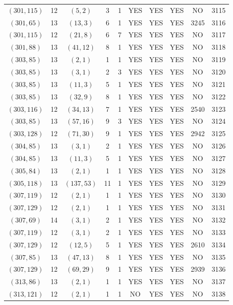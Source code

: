 \begin{longtable}{|c|c|c|c|c|c|c|c|c|c|}
$(301, 115)$ & 12 & $(5, 2)$ & 3 & 1 & YES & YES & YES & NO & 3115\\
$(301, 65)$ & 13 & $(13, 3)$ & 6 & 1 & YES & YES & YES & 3245 & 3116\\
$(301, 115)$ & 12 & $(21, 8)$ & 6 & 7 & YES & YES & YES & NO & 3117\\
$(301, 88)$ & 13 & $(41, 12)$ & 8 & 1 & YES & YES & YES & NO & 3118\\
$(303, 85)$ & 13 & $(2, 1)$ & 1 & 1 & YES & YES & YES & NO & 3119\\
$(303, 85)$ & 13 & $(3, 1)$ & 2 & 3 & YES & YES & YES & NO & 3120\\
$(303, 85)$ & 13 & $(11, 3)$ & 5 & 1 & YES & YES & YES & NO & 3121\\
$(303, 85)$ & 13 & $(32, 9)$ & 8 & 1 & YES & YES & YES & NO & 3122\\
$(303, 116)$ & 12 & $(34, 13)$ & 7 & 1 & YES & YES & YES & 2540 & 3123\\
$(303, 85)$ & 13 & $(57, 16)$ & 9 & 3 & YES & YES & YES & NO & 3124\\
$(303, 128)$ & 12 & $(71, 30)$ & 9 & 1 & YES & YES & YES & 2942 & 3125\\
$(304, 85)$ & 13 & $(3, 1)$ & 2 & 1 & YES & YES & YES & NO & 3126\\
$(304, 85)$ & 13 & $(11, 3)$ & 5 & 1 & YES & YES & YES & NO & 3127\\
$(305, 84)$ & 13 & $(2, 1)$ & 1 & 1 & YES & YES & YES & NO & 3128\\
$(305, 118)$ & 13 & $(137, 53)$ & 11 & 1 & YES & YES & YES & NO & 3129\\
$(307, 119)$ & 12 & $(2, 1)$ & 1 & 1 & YES & YES & YES & NO & 3130\\
$(307, 129)$ & 12 & $(2, 1)$ & 1 & 1 & YES & YES & YES & NO & 3131\\
$(307, 69)$ & 14 & $(3, 1)$ & 2 & 1 & YES & YES & YES & NO & 3132\\
$(307, 119)$ & 12 & $(3, 1)$ & 2 & 1 & YES & YES & YES & NO & 3133\\
$(307, 129)$ & 12 & $(12, 5)$ & 5 & 1 & YES & YES & YES & 2610 & 3134\\
$(307, 85)$ & 13 & $(47, 13)$ & 8 & 1 & YES & YES & YES & NO & 3135\\
$(307, 129)$ & 12 & $(69, 29)$ & 9 & 1 & YES & YES & YES & 2939 & 3136\\
$(313, 86)$ & 13 & $(2, 1)$ & 1 & 1 & YES & YES & YES & NO & 3137\\
$(313, 121)$ & 12 & $(2, 1)$ & 1 & 1 & NO & YES & YES & NO & 3138\\

\end{longtable}
